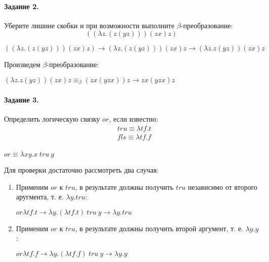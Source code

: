 \documentclass[a4paper,12pt]{article}
\begin{document}
\paragraph{Задание 2.} Уберите лишние скобки и при возможности выполните $\beta$-преобразование:
\[
	\left(\left(\lambda z . \left(z\left(yz\right)\right)\right)\left(zx\right)z\right)
\]

\begin{Solution}

$\left(\left(\lambda z . \left(z\left(yz\right)\right)\right)\left(zx\right)z\right) \rightarrow \left(\lambda z . \left(z\left(yz\right)\right)\right)\left(zx\right)z \rightarrow \left(\lambda z . z\left(yz\right)\right)\left(zx\right)z$

Произведем $\beta$-преобразование:

$\left(\lambda z . z\left(yz\right)\right)\left(zx\right)z \equiv_{\beta} \left(zx\left(yzx\right)\right)z \rightarrow zx\left(yzx\right)z$

\end{Solution}

\paragraph{Задание 3.} Определить логическую связку $or$, если известно:
\[
	\begin{split}
		&tru \equiv \lambda tf . t\\
		&fls \equiv \lambda tf . f\\
	\end{split}
\]

\begin{Solution}

$or \equiv \lambda xy . x ~tru~ y$

Для проверки достаточно рассмотреть два случая:

\begin{enumerate}
\item Применим $or$ к $tru$, в результате должны получить $tru$ независимо от второго аругмента, т. е. $\lambda y . tru$:

$or \lambda tf . t \rightarrow \lambda y . \left(\lambda tf . t\right) ~tru~ y \rightarrow \lambda y . tru$

\item Применим $or$ к $tru$, в результате должны получить второй аргумент, т. е. $\lambda y . y$:

$or \lambda tf . f \rightarrow \lambda y . \left(\lambda tf . f\right) ~tru~ y \rightarrow \lambda y . y$
\end{enumerate}

\end{Solution}
\end{document}
